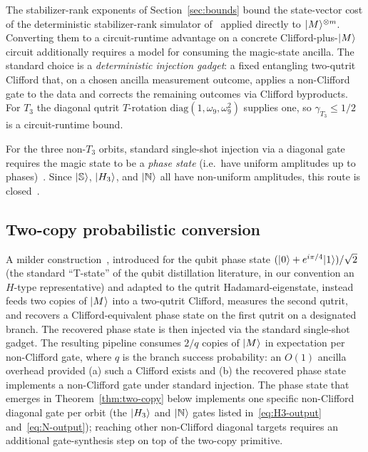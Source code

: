 \documentclass[11pt]{article}
\theoremstyle{definition}
\newcommand{\microspace}{\mspace{0.5mu}}
\newcommand{\ket}[1]{\lvert\microspace #1 \microspace \rangle}
\newcommand{\Strange}{\ket{\mathbb{S}}}
\newcommand{\Hth}{\ket{H_3}}
\newcommand{\Norrell}{\ket{\mathbb{N}}}
\begin{document}
	The stabilizer-rank exponents of Section~\ref{sec:bounds} bound the
	state-vector cost of the deterministic stabilizer-rank simulator
	of~\cite{bravyi2016trading} applied directly to $\ket M^{\otimes m}$.
	Converting them to a circuit-runtime advantage on a concrete
	Clifford-plus-$\ket M$ circuit additionally requires a model for
	consuming the magic-state ancilla. The standard choice is a
	\emph{deterministic injection gadget}: a fixed entangling two-qutrit
	Clifford that, on a chosen ancilla measurement outcome, applies a
	non-Clifford gate to the data and corrects the remaining outcomes
	via Clifford byproducts. For $T_3$ the diagonal qutrit $T$-rotation
	$\mathrm{diag}(1, \omega_9, \omega_9^2)$ supplies one, so
	$\gamma_{T_3} \le 1/2$ is a circuit-runtime bound.
	
	For the three non-$T_3$ orbits, standard single-shot injection
	via a diagonal gate requires the magic state to be a
	\emph{phase state} (i.e.\ have uniform amplitudes up to
	phases)~\cite{anwar2012qutrit, howard2012qudit,
	cui2017diagonal}. Since $\Strange$, $\Hth$, and $\Norrell$ all
	have non-uniform amplitudes, this route is
	closed~\cite{prakash2020magic, prakash2020contextual}.

	\subsection{Two-copy probabilistic conversion}\label{ssec:two-copy}

	A milder
	construction~\cite{bravyi2005universal, anwar2012qutrit},
	introduced for the qubit phase state $(\ket 0 + e^{i\pi/4} \ket 1)/\sqrt 2$
	(the standard ``T-state'' of the qubit distillation literature, in
	our convention an $H$-type representative) and adapted to the
	qutrit Hadamard-eigenstate, instead feeds two copies of $\ket{M}$
	into a two-qutrit Clifford, measures the second qutrit, and
	recovers a Clifford-equivalent phase state on the first qutrit on
	a designated branch. The recovered phase state is
	then injected via the standard single-shot gadget. The resulting
	pipeline consumes $2/q$ copies of $\ket{M}$ in expectation per
	non-Clifford gate, where $q$ is the branch success probability:
	an $O(1)$ ancilla overhead provided (a) such a Clifford exists
	and (b) the recovered phase state implements a non-Clifford gate
	under standard injection. The phase state that emerges in
	Theorem~\ref{thm:two-copy} below implements one specific
	non-Clifford diagonal gate per orbit (the $\Hth$ and $\Norrell$
	gates listed in~\eqref{eq:H3-output} and~\eqref{eq:N-output}); reaching other
	non-Clifford diagonal targets requires an additional
	gate-synthesis step on top of the two-copy primitive.
\end{document}
